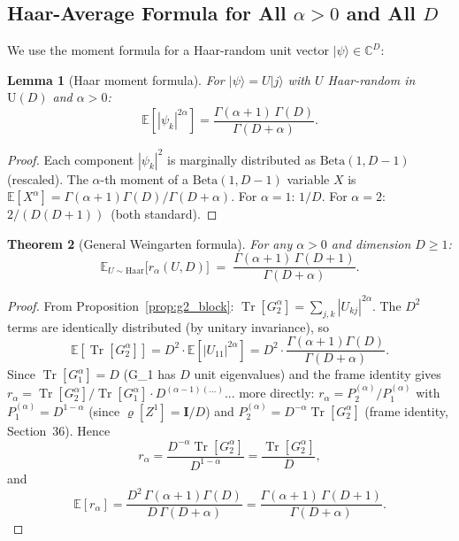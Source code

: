 \documentclass[12pt,a4paper]{article}
\newtheorem{theorem}{Theorem}[section]
\newtheorem{lemma}[theorem]{Lemma}
\begin{document}
\subsection{Haar-Average Formula for All $\alpha>0$ and All $D$}
\label{sec:haar_general_alpha}

We use the moment formula for a Haar-random unit vector $|\psi\rangle\in\mathbb{C}^D$:

\begin{lemma}[Haar moment formula]
\label{lem:haar_moment}
For $|\psi\rangle=U|j\rangle$ with $U$ Haar-random in $\mathrm{U}(D)$ and $\alpha>0$:
\[
  \mathbb{E}[|\psi_k|^{2\alpha}]
  = \frac{\Gamma(\alpha+1)\,\Gamma(D)}{\Gamma(D+\alpha)}.
\]
\end{lemma}

\begin{proof}
Each component $|\psi_k|^2$ is marginally distributed as $\mathrm{Beta}(1,D-1)$ (rescaled).
The $\alpha$-th moment of a $\mathrm{Beta}(1,D-1)$ variable $X$ is
$\mathbb{E}[X^\alpha]=\Gamma(\alpha+1)\Gamma(D)/\Gamma(D+\alpha)$.
For $\alpha=1$: $1/D$. For $\alpha=2$: $2/(D(D+1))$~(both standard).
\end{proof}

\begin{theorem}[General Weingarten formula]
\label{thm:weingarten_general}
For any $\alpha>0$ and dimension $D\geq1$:
\[
  \boxed{
  \mathbb{E}_{U\sim\mathrm{Haar}}\bigl[r_\alpha(U,D)\bigr]
  \;=\; \frac{\Gamma(\alpha+1)\,\Gamma(D+1)}{\Gamma(D+\alpha)}.}
\]
\end{theorem}

\begin{proof}
From Proposition~\ref{prop:g2_block}:
$\operatorname{Tr}[G_2^\alpha]=\sum_{j,k}|U_{kj}|^{2\alpha}$.
The $D^2$ terms are identically distributed (by unitary invariance), so
\[
  \mathbb{E}[\operatorname{Tr}[G_2^\alpha]]
  = D^2\cdot\mathbb{E}[|U_{11}|^{2\alpha}]
  = D^2\cdot\frac{\Gamma(\alpha+1)\Gamma(D)}{\Gamma(D+\alpha)}.
\]
Since $\operatorname{Tr}[G_1^\alpha]=D$ (G_1 has $D$ unit eigenvalues) and the frame identity gives
$r_\alpha=\operatorname{Tr}[G_2^\alpha]/\operatorname{Tr}[G_1^\alpha]\cdot D^{(\alpha-1)(\ldots)}$...
more directly: $r_\alpha=P_2^{(\alpha)}/P_1^{(\alpha)}$ with
$P_1^{(\alpha)}=D^{1-\alpha}$ (since $\varrho[Z^1]=\mathbf{I}/D$)
and $P_2^{(\alpha)}=D^{-\alpha}\operatorname{Tr}[G_2^\alpha]$ (frame identity, Section~36).
Hence
\[
  r_\alpha = \frac{D^{-\alpha}\operatorname{Tr}[G_2^\alpha]}{D^{1-\alpha}}
  = \frac{\operatorname{Tr}[G_2^\alpha]}{D},
\]
and
\[
  \mathbb{E}[r_\alpha]
  = \frac{D^2\,\Gamma(\alpha+1)\Gamma(D)}{D\,\Gamma(D+\alpha)}
  = \frac{\Gamma(\alpha+1)\,\Gamma(D+1)}{\Gamma(D+\alpha)}.
\]
\end{proof}
\end{document}
